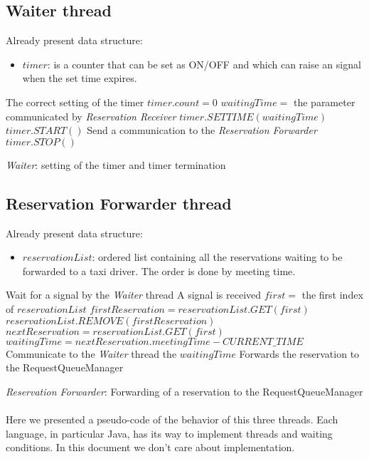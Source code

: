 \subsection{Waiter thread}
\begin{algorithm}[H]
\begin{algorithmic}
\REQUIRE Already present data structure:
\begin{itemize}
	\item $timer$: is a counter that can be set as ON/OFF and which can raise an signal when the set time expires.
\end{itemize}
\ENSURE The correct setting of the timer
\STATE $timer.count = 0$ 
		\STATE $waitingTime=$ the parameter communicated by \textit{Reservation Receiver}
		\STATE $timer.SETTIME(waitingTime)$
		\STATE $timer.START()$
	\ENDIF
		\STATE Send a communication to the \textit{Reservation Forwarder}
		\STATE $timer.STOP()$
	\ENDIF
\ENDWHILE
\end{algorithmic}
\caption{\textit{Waiter}: setting of the timer and timer termination}
\end{algorithm}
\subsection{Reservation Forwarder thread}
\begin{algorithm}[H]
\begin{algorithmic}
\REQUIRE Already present data structure:
\begin{itemize}
	\item $reservationList$: ordered list containing all the reservations waiting to be forwarded to a taxi driver. The order is done by meeting time.
\end{itemize}
	\STATE Wait for a signal by the \textit{Waiter} thread
	\STATE A signal is received
	\STATE $first=$ the first index of $reservationList$
	\STATE $firstReservation=reservationList.GET(first)$ 
	\STATE $reservationList.REMOVE(firstReservation)$ 
	\STATE $nextReservation = reservationList.GET(first)$
	\STATE $waitingTime = nextReservation.meetingTime - CURRENT\_TIME$
	\STATE Communicate to the \textit{Waiter} thread the $waitingTime$
	\STATE Forwards the reservation to the RequestQueueManager
\ENDWHILE
\end{algorithmic}
\caption{\textit{Reservation Forwarder}: Forwarding of a reservation to the RequestQueueManager}
\end{algorithm}

\paragraph{} Here we presented a pseudo-code of the behavior of this three threads. Each language, in particular Java, has its way to implement threads and waiting conditions. In this document we don't care about implementation.